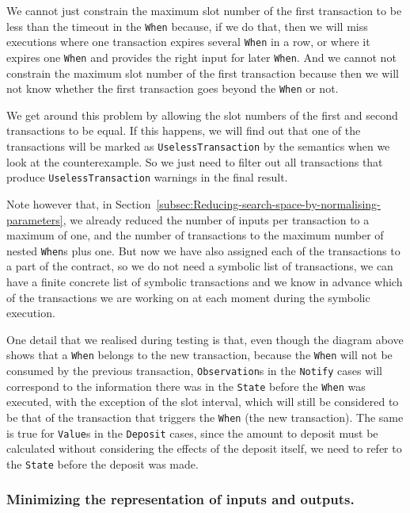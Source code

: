 \documentclass[english,runningheads]{llncs}
\begin{document}
We cannot just constrain the maximum slot number of the first transaction
to be less than the timeout in the \texttt{When} because, if we do
that, then we will miss executions where one transaction expires several
\texttt{When} in a row, or where it expires one \texttt{When} and provides
the right input for later \texttt{When}. And we cannot not constrain
the maximum slot number of the first transaction because then we will
not know whether the first transaction goes beyond the \texttt{When}
or not.

We get around this problem by allowing the slot numbers of the first
and second transactions to be equal. If this happens, we will find
out that one of the transactions will be marked as \texttt{UselessTransaction}
by the semantics when we look at the counterexample. So we just need
to filter out all transactions that produce \texttt{UselessTransaction}
warnings in the final result.

Note however that, in Section~\ref{subsec:Reducing-search-space-by-normalising-parameters},
we already reduced the number of inputs per transaction to a maximum
of one, and the number of transactions to the maximum number of nested
\texttt{When}s plus one. But now we have also assigned each of the
transactions to a part of the contract, so we do not need a symbolic
list of transactions, we can have a finite concrete list of symbolic
transactions and we know in advance which of the transactions we are
working on at each moment during the symbolic execution.

One detail that we realised during testing is that, even though
the diagram above shows that a \texttt{When} belongs to the new transaction,
because the \texttt{When} will not be consumed by the previous transaction,
\texttt{Observation}s in the \texttt{Notify} cases will correspond to the
information there was in the \texttt{State} before the \texttt{When}
was executed, with the exception of the slot interval, which will still be
considered to be that of the transaction that triggers the \texttt{When} (the
new transaction). The same is true for \texttt{Value}s in the \texttt{Deposit}
cases, since the amount to deposit must be calculated without considering the
effects of the deposit itself, we need to refer to the \texttt{State} before
the deposit was made.

\subsubsection{Minimizing the representation of inputs and outputs.}
\end{document}
